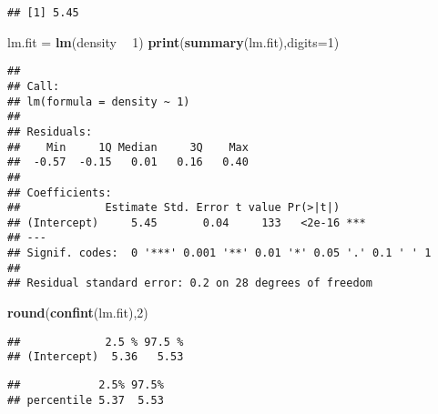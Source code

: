 \documentclass[]{book}
\newenvironment{Shaded}{\begin{snugshade}}{\end{snugshade}}
\newcommand{\DataTypeTok}[1]{\textcolor[rgb]{0.13,0.29,0.53}{#1}}
\newcommand{\DecValTok}[1]{\textcolor[rgb]{0.00,0.00,0.81}{#1}}
\newcommand{\KeywordTok}[1]{\textcolor[rgb]{0.13,0.29,0.53}{\textbf{#1}}}
\newcommand{\NormalTok}[1]{#1}
\newcommand{\OperatorTok}[1]{\textcolor[rgb]{0.81,0.36,0.00}{\textbf{#1}}}
\newcommand{\StringTok}[1]{\textcolor[rgb]{0.31,0.60,0.02}{#1}}
\begin{document}
\begin{verbatim}
## [1] 5.45
\end{verbatim}

\begin{Shaded}
\begin{Highlighting}[]
\NormalTok{lm.fit =}\StringTok{  }\KeywordTok{lm}\NormalTok{(density }\OperatorTok{~}\StringTok{ }\DecValTok{1}\NormalTok{)}
\KeywordTok{print}\NormalTok{(}\KeywordTok{summary}\NormalTok{(lm.fit),}\DataTypeTok{digits=}\DecValTok{1}\NormalTok{)}
\end{Highlighting}
\end{Shaded}

\begin{verbatim}
## 
## Call:
## lm(formula = density ~ 1)
## 
## Residuals:
##    Min     1Q Median     3Q    Max 
##  -0.57  -0.15   0.01   0.16   0.40 
## 
## Coefficients:
##             Estimate Std. Error t value Pr(>|t|)    
## (Intercept)     5.45       0.04     133   <2e-16 ***
## ---
## Signif. codes:  0 '***' 0.001 '**' 0.01 '*' 0.05 '.' 0.1 ' ' 1
## 
## Residual standard error: 0.2 on 28 degrees of freedom
\end{verbatim}

\begin{Shaded}
\begin{Highlighting}[]
\KeywordTok{round}\NormalTok{(}\KeywordTok{confint}\NormalTok{(lm.fit),}\DecValTok{2}\NormalTok{)}
\end{Highlighting}
\end{Shaded}

\begin{verbatim}
##             2.5 % 97.5 %
## (Intercept)  5.36   5.53
\end{verbatim}

\begin{Shaded}
\end{Shaded}

\begin{verbatim}
##            2.5% 97.5%
## percentile 5.37  5.53
\end{verbatim}
\end{document}
